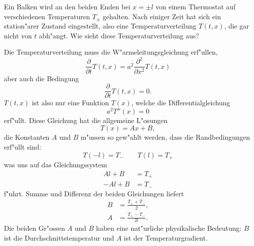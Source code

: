 Ein Balken wird an den beiden Enden bei $x=\pm l$ von einem Thermostat
auf verschiedenen Temperaturen $T_\pm$ gehalten. Nach einiger Zeit
hat sich ein station"arer Zustand eingestellt, also eine Temperaturverteilung
$T(t,x)$, die gar nicht von $t$ abh"angt. Wie sieht diese Temperaturverteilung
aus?

\begin{loesung}
Die Temperaturverteilung muss die W"armeleitungsgleichung erf"ullen,
\[
\frac{\partial}{\partial t}T(t,x)=
a^2\frac{\partial^2}{\partial x^2}T(t,x)
\]
aber auch die Bedingung
\[
\frac{\partial}{\partial t}T(t,x)=0.
\]
$T(t,x)$ ist also nur eine Funktion $T(x)$, welche die Differentialgleichung
\[
a^2T''(x)=0
\]
erf"ullt. Diese Gleichung hat die allgemeine L"osungen
\[
T(x)=Ax+B,
\]
die Konstanten $A$ und $B$ m"ussen so gew"ahlt werden, dass
die Randbedingungen erf"ullt sind:
\[
T(-l)=T_-\qquad T(l)=T_+
\]
was uns auf das Gleichungssystem
\begin{align*}
Al+B&=T_+\\
-Al+B&=T_-
\end{align*}
f"uhrt.
Summe und Differenz der beiden Gleichungen liefert
\begin{align*}
B&=\frac{T_++T_-}{2},
\\
A&=\frac{T_+-T_-}{2l}.
\end{align*}
Die beiden Gr"ossen $A$ und $B$ haben eine nat"urliche physikalische
Bedeutung: $B$ ist die Durchschnitts\-temperatur und $A$ ist der
Temperaturgradient.
\end{loesung}
